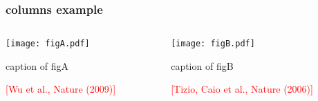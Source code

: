     \begin{frame}
    \frametitle{columns example}
    \begin{columns}
    \begin{column}{.5\textwidth}
    \centering
    \texttt{[image: figA.pdf]}
    
    caption of figA
    
    \scriptsize\textcolor{red}{[Wu et al., Nature (2009)]}
    \end{column}%
    \begin{column}{.5\textwidth}
    \centering
    \texttt{[image: figB.pdf]}
    
    caption of figB
    
    \scriptsize\textcolor{red}{[Tizio, Caio et al., Nature (2006)]}
    \end{column}
    \end{columns}
    \end{frame}